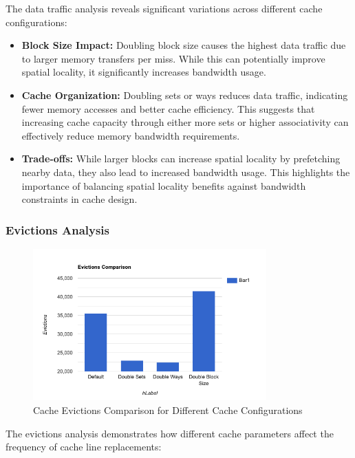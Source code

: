 \documentclass[10pt]{article}
\begin{document}
The data traffic analysis reveals significant variations across different cache configurations:

\begin{itemize}
    \item \textbf{Block Size Impact:} Doubling block size causes the highest data traffic due to larger memory transfers per miss. While this can potentially improve spatial locality, it significantly increases bandwidth usage.
    
    \item \textbf{Cache Organization:} Doubling sets or ways reduces data traffic, indicating fewer memory accesses and better cache efficiency. This suggests that increasing cache capacity through either more sets or higher associativity can effectively reduce memory bandwidth requirements.
    
    \item \textbf{Trade-offs:} While larger blocks can increase spatial locality by prefetching nearby data, they also lead to increased bandwidth usage. This highlights the importance of balancing spatial locality benefits against bandwidth constraints in cache design.
\end{itemize}

\subsubsection{Evictions Analysis}
\begin{figure}[H]
    \centering
    \includegraphics[width=0.8\textwidth]{./images/evictions.png}
    \caption{Cache Evictions Comparison for Different Cache Configurations}
\end{figure}

The evictions analysis demonstrates how different cache parameters affect the frequency of cache line replacements:
\end{document}
